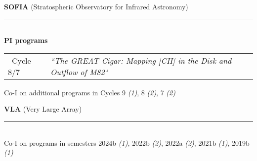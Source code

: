 \documentclass[11pt]{article}
\makeatletter
\def\vhrulefill#1{\leavevmode\leaders\hrule\@height#1\hfill \kern\z@}
\makeatother
\begin{document}

{\bf SOFIA} {\small (Stratospheric Observatory for Infrared Astronomy)} \vhrulefill{0.5pt}\\
{\bf\small PI programs}
\vspace{-9pt}
\begin{longtable}{p{}p{}}
\ Cycle 8/7 & \textit{``The GREAT Cigar: Mapping [CII] in the Disk and Outflow of M82"}\\
\end{longtable}
\vspace{-12pt}
Co-I on additional programs in Cycles 9 {\em(1)}, 8 {\em(2)}, 7 {\em(2)}\medskip


{\bf VLA} {\small (Very Large Array)} \vhrulefill{0.5pt}\\
Co-I on programs in semesters 2024b {\em(1)}, 2022b {\em(2)}, 2022a {\em(2)}, 2021b {\em(1)}, 2019b {\em(1)}\medskip
\end{document}

